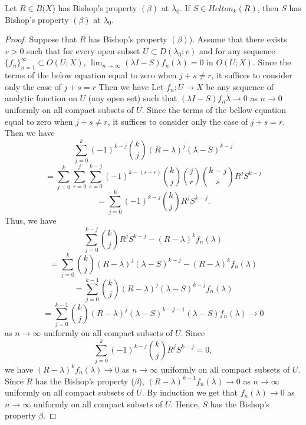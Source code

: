 \documentclass[10pt,a4paper]{amsart}
\begin{document}
\begin{theorem} Let $R\in B(X$) has Bishop's property $(\beta)$ at $\lambda_{0}$. If
$S\in Helton_{k}(R)$, then $S$ has Bishop's property $(\beta)$ at
$\lambda_{0}$.
\end{theorem}

\begin{proof} Suppose that $R$ has Bishop's property $(\beta)$). Assume that there
exists $v > 0$ such that for every open subset $U \subset
D(\lambda_{0}; v)$ and for any sequence $\{f_{n}\}^{\infty}_{ n=1}
\subset O(U;X)$, $\lim_{n\rightarrow \infty}(\lambda I-
S)f_{n}(\lambda) = 0$ in $O(U;X)$. Since the terms of the below
equation equal to zero when $j + s \not= r$, it suffices to
consider only the case of $j + s = r$ Then we have Let
$f_{n}:U\rightarrow X$ be any sequence of analytic function on $U$
(any open set) such that $(\lambda I- S)f_{n}\lambda\rightarrow 0$
as $n\rightarrow 0$ uniformly on all compact subsets of $U$. Since
the terms of the bellow equation equal to zero when $j+s\neq r$,
it suffices to consider only the case of $j+s=r$. Then we have
$$\sum^{k}_{j=0}(-1)^{k-j}\binom{k}{j}(R-\lambda)^{j}(\lambda-S)^{k-j}$$
$$=\sum^{k}_{j=0}\sum^{j}_{r=0}\sum^{k-j}_{s=0}(-1)^{k-(s+r)}\binom{k}{j}\binom{j}{r}\binom{k-j}{s}R^{j}S^{k-j}$$
$$=\sum^{k}_{j=0}(-1)^{k-j}\binom{k}{j}R^{j}S^{k-j}.$$
Thus, we have
$$\sum^{k-j}_{j=0}\binom{k}{j}R^{j}S^{k-j}-(R-\lambda)^{k}f_{n}(\lambda)$$
$$=\sum^{k}_{j=0}\binom{k}{j}(R-\lambda)^{j}(\lambda -S)^{k-j}-(R-\lambda)^{k}f_{n}(\lambda)$$
$$=\sum^{k-1}_{j=0}\binom{k}{j}(R-\lambda)^{j}(\lambda -S)^{k-j}f_{n}(\lambda)$$
$$=\sum^{k-1}_{j=0}\binom{k}{j}(R-\lambda)^{j}(\lambda -S)^{k-j-1}(\lambda-S)f_{n}(\lambda)\rightarrow 0$$
as $n\rightarrow\infty$ uniformly on all compact subsets of $U$.
Since
$$\sum^{k}_{j=0}(-1)^{k-j}\binom{k}{j}R^{j}S^{k-j}=0,$$
we have $(R-\lambda)^{k}f_{n}(\lambda)\rightarrow 0$ as
$n\rightarrow \infty$ uniformly on all compact subsets of $U$.
Since $R$ has the Bishop's property ($\beta$),
$(R-\lambda)^{k-1}f_{n}(\lambda)\rightarrow 0$ as $n\rightarrow
\infty$ uniformly on all compact subsets of $U$. By induction we
get that $f_{n}(\lambda)\rightarrow 0$ as $n\rightarrow \infty$
uniformly on all compact subsets of $U$. Hence, $S$ has the
Bishop's property $\beta$.
\end{proof}
\end{document}
